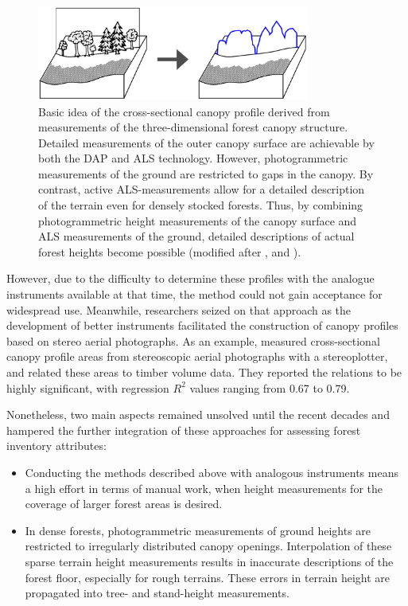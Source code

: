 \begin{figure}[bth]
	\centering
	\includegraphics[width=0.80\textwidth]{Figures/Cross_Section/Cross-Section_A4_v2}
	\caption[Basic idea of the cross-sectional canopy profile derived from measurements of the three-dimensional
	forest canopy structure.]{Basic idea of the cross-sectional canopy profile derived from measurements of the three-dimensional forest canopy structure.  
		Detailed measurements of the outer canopy surface are achievable by both the \ac{DAP} and \ac{ALS} technology.
		However, photogrammetric measurements of the ground are restricted to gaps in the canopy. By contrast, active \ac{ALS}-measurements 
		allow for a detailed description of the terrain even for densely stocked forests. Thus, by combining 
		photogrammetric height measurements of the canopy surface and \ac{ALS} measurements of the ground, 
		detailed descriptions of actual forest heights become possible (modified after 
		\cite{Aldred.1985}, \cite{Nelson.1984} and \cite{Nilsson.1996}).}
	\label{fig:profile}
\end{figure}

However, due to the difficulty to determine these profiles with the analogue instruments available at that time, 
the method could not gain acceptance for widespread use. Meanwhile, researchers seized on that approach as the
development of better instruments facilitated the construction of canopy profiles based on stereo aerial photographs.
As an example, \textcite{Maclean.1984} measured cross-sectional canopy profile areas from stereoscopic aerial photographs with a stereoplotter,
and related these areas to timber volume data. They reported the relations to be highly significant, with regression $R^2$ values
ranging from 0.67 to 0.79. 

Nonetheless,  
two main aspects remained unsolved until the recent decades and hampered the further integration
of these approaches for assessing forest inventory attributes:

\begin{itemize}
	\item Conducting the methods described above with analogous instruments means a high effort in terms of manual
		work, when height measurements for the coverage of larger forest areas is desired.
	\item In dense forests, photogrammetric measurements of ground heights are restricted to irregularly distributed canopy openings.
		Interpolation of these sparse terrain height measurements results in inaccurate descriptions of the forest floor, especially for rough terrains.
		These errors in terrain height are propagated into tree- and stand-height measurements. 
\end{itemize}


